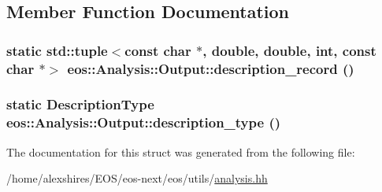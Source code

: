 \subsection{Member Function Documentation}
\hypertarget{structeos_1_1Analysis_1_1Output_aef0dc96dd006ae72050dc34ac745df15}{
\subsubsection[{description\_\-record}]{\setlength{\rightskip}{0pt plus 5cm}static std::tuple$<$const char $\ast$, double, double, int, const char $\ast$$>$ eos::Analysis::Output::description\_\-record ()}}
\label{structeos_1_1Analysis_1_1Output_aef0dc96dd006ae72050dc34ac745df15}
\hypertarget{structeos_1_1Analysis_1_1Output_afe79cdeca03867008ffebb0796600b6a}{
\subsubsection[{description\_\-type}]{\setlength{\rightskip}{0pt plus 5cm}static {\bf DescriptionType} eos::Analysis::Output::description\_\-type ()}}
\label{structeos_1_1Analysis_1_1Output_afe79cdeca03867008ffebb0796600b6a}


The documentation for this struct was generated from the following file:\begin{DoxyCompactItemize}
\item 
/home/alexshires/EOS/eos-\/next/eos/utils/\hyperlink{analysis_8hh}{analysis.hh}\end{DoxyCompactItemize}
